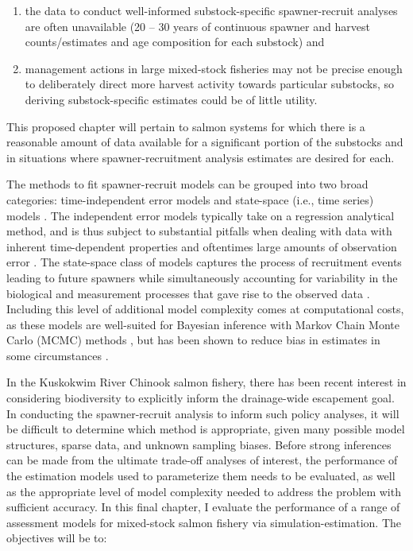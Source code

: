 \documentclass[12pt,]{book}
\theoremstyle{definition}
\theoremstyle{definition}
\theoremstyle{definition}
\theoremstyle{remark}
\begin{document}
\begin{enumerate}
\def\labelenumi{(\arabic{enumi})}
\item
  the data to conduct well-informed substock-specific spawner-recruit
  analyses are often unavailable (20 -- 30 years of continuous spawner
  and harvest counts/estimates and age composition for each substock)
  and
\item
  management actions in large mixed-stock fisheries may not be precise
  enough to deliberately direct more harvest activity towards particular
  substocks, so deriving substock-specific estimates could be of little
  utility.
\end{enumerate}

\noindent
This proposed chapter will pertain to salmon systems for which there is
a reasonable amount of data available for a significant portion of the
substocks and in situations where spawner-recruitment analysis estimates
are desired for each.

The methods to fit spawner-recruit models can be grouped into two broad
categories: time-independent error models
\citep[i.e.,][]{clark-etal-2009} and state-space (i.e., time series)
models \citep{fleischman-etal-2013, su-peterman-2012}. The independent
error models typically take on a regression analytical method, and is
thus subject to substantial pitfalls when dealing with data with
inherent time-dependent properties and oftentimes large amounts of
observation error \citep{walters-martell-2004}. The state-space class of
models captures the process of recruitment events leading to future
spawners while simultaneously accounting for variability in the
biological and measurement processes that gave rise to the observed data
\citep{devalpine-hastings-2002, fleischman-etal-2013}. Including this
level of additional model complexity comes at computational costs, as
these models are well-suited for Bayesian inference with Markov Chain
Monte Carlo (MCMC) methods \citep[Ch. 4]{newman-etal-2014}, but has been
shown to reduce bias in estimates in some circumstances
\citep{su-peterman-2012, walters-martell-2004}.

In the Kuskokwim River Chinook salmon fishery, there has been recent
interest in considering biodiversity to explicitly inform the
drainage-wide escapement goal. In conducting the spawner-recruit
analysis to inform such policy analyses, it will be difficult to
determine which method is appropriate, given many possible model
structures, sparse data, and unknown sampling biases. Before strong
inferences can be made from the ultimate trade-off analyses of interest,
the performance of the estimation models used to parameterize them needs
to be evaluated, as well as the appropriate level of model complexity
needed to address the problem with sufficient accuracy. In this final
chapter, I evaluate the performance of a range of assessment models for
mixed-stock salmon fishery via simulation-estimation. The objectives
will be to:
\end{document}
